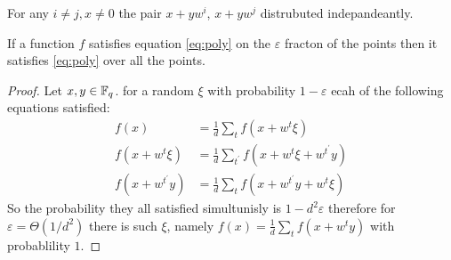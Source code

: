\begin{claim}

\end{claim}


\begin{claim}
For any $i\neq j,x \neq 0 $ the pair $x + yw^{i}$, $x+ yw^{j}$ distrubuted indepandeantly.
\end{claim}

\begin{claim}
  If a function $f$ satisfies equation \cref{eq:poly} on the $\varepsilon$ fracton of the points then it satisfies \cref{eq:poly} over all the points.
\end{claim}

\begin{proof}
  Let $x,y \in \mathbb{F}_{q}$. for a random $\xi$ with probability $1 - \varepsilon$ ecah of the following equations satisfied: 
  \begin{equation*}
    \begin{split}
      f(x) & = \frac{1}{d}\sum_{t}{ f\left( x + w^{t}\xi \right)  } \\
      f\left( x + w^{t}\xi \right)   & = \frac{1}{d} \sum_{t^{\prime}}{ f\left( x + w^{t}\xi + w^{t^{\prime}}y \right)  } \\
      f(x + w^{t^\prime}y) & = \frac{1}{d}\sum_{t}{ f\left( x + w^{t^\prime}y + w^{t}\xi \right)  } 
    \end{split}
  \end{equation*}
  So the probability they all satisfied simultunisly is $ 1 - d^{2}\varepsilon$ therefore  for $\varepsilon =\Theta\left( 1/d^{2} \right)$ there is such $\xi$, namely $f(x)  = \frac{1}{d}\sum_{t}{ f\left( x + w^{t}y \right)  } $ with probablility $1$.
\end{proof}




